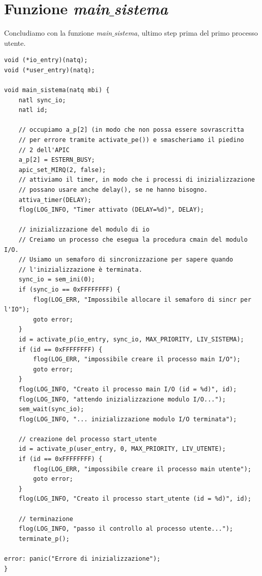 \documentclass[11pt]{report}
\theoremstyle{definition}
\begin{document}
\section{Funzione \emph{main$\_$sistema}}
Concludiamo con la funzione \emph{main$\_$sistema}, ultimo step prima del primo processo utente.
\small 
\begin{verbatim}
void (*io_entry)(natq);
void (*user_entry)(natq);

void main_sistema(natq mbi) {
    natl sync_io;
    natl id;
	
    // occupiamo a_p[2] (in modo che non possa essere sovrascritta
    // per errore tramite activate_pe()) e smascheriamo il piedino
    // 2 dell'APIC
    a_p[2] = ESTERN_BUSY;
    apic_set_MIRQ(2, false);
    // attiviamo il timer, in modo che i processi di inizializzazione
    // possano usare anche delay(), se ne hanno bisogno.
    attiva_timer(DELAY);
    flog(LOG_INFO, "Timer attivato (DELAY=%d)", DELAY);
	
    // inizializzazione del modulo di io
    // Creiamo un processo che esegua la procedura cmain del modulo I/O.
    // Usiamo un semaforo di sincronizzazione per sapere quando
    // l'inizializzazione è terminata.
    sync_io = sem_ini(0);
    if (sync_io == 0xFFFFFFFF) {
        flog(LOG_ERR, "Impossibile allocare il semaforo di sincr per l'IO");
        goto error;
    }
    id = activate_p(io_entry, sync_io, MAX_PRIORITY, LIV_SISTEMA);
    if (id == 0xFFFFFFFF) {
        flog(LOG_ERR, "impossibile creare il processo main I/O");
        goto error;
    }
    flog(LOG_INFO, "Creato il processo main I/O (id = %d)", id);
    flog(LOG_INFO, "attendo inizializzazione modulo I/O...");
    sem_wait(sync_io);
    flog(LOG_INFO, "... inizializzazione modulo I/O terminata");
	
    // creazione del processo start_utente
    id = activate_p(user_entry, 0, MAX_PRIORITY, LIV_UTENTE);
    if (id == 0xFFFFFFFF) {
        flog(LOG_ERR, "impossibile creare il processo main utente");
        goto error;
    }
    flog(LOG_INFO, "Creato il processo start_utente (id = %d)", id);
	
    // terminazione
    flog(LOG_INFO, "passo il controllo al processo utente...");
    terminate_p();
	
error: panic("Errore di inizializzazione");
}
\end{verbatim}
\normalsize 
\end{document}
